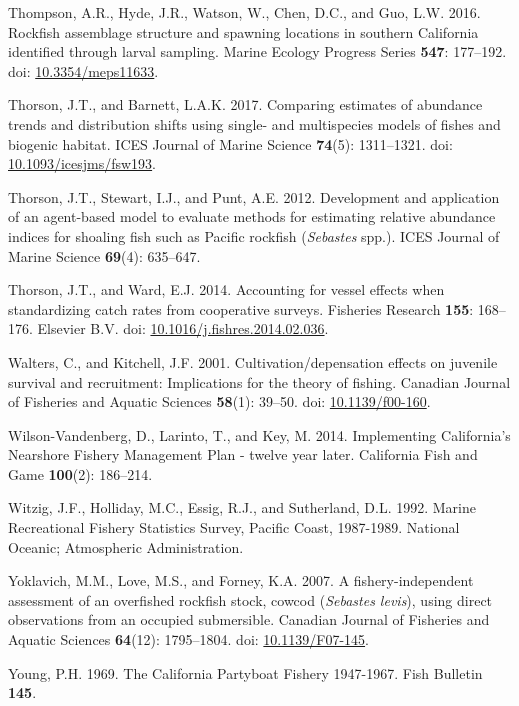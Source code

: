 \documentclass[
  english,
  a4paper,
]{article}
\newlength{\cslhangindent}
\newlength{\cslentryspacingunit} %
\newenvironment{CSLReferences}[2] %
 {%
  \setlength{\parindent}{0pt}
  \ifodd #1
  \let\oldpar\par
  \def\par{\hangindent=\cslhangindent\oldpar}
  \fi
  \setlength{\parskip}{#2\cslentryspacingunit}
 }%
 {}
\begin{document}
\begin{CSLReferences}{1}{0}
\leavevmode{}%
Thompson, A.R., Hyde, J.R., Watson, W., Chen, D.C., and Guo, L.W. 2016. {Rockfish assemblage structure and spawning locations in southern California identified through larval sampling}. Marine Ecology Progress Series \textbf{547}: 177--192. doi: \href{https://doi.org/10.3354/meps11633}{10.3354/meps11633}.

\leavevmode{}%
Thorson, J.T., and Barnett, L.A.K. 2017. {Comparing estimates of abundance trends and distribution shifts using single- and multispecies models of fishes and biogenic habitat}. ICES Journal of Marine Science \textbf{74}(5): 1311--1321. doi: \href{https://doi.org/10.1093/icesjms/fsw193}{10.1093/icesjms/fsw193}.

\leavevmode{}%
Thorson, J.T., Stewart, I.J., and Punt, A.E. 2012. {Development and application of an agent-based model to evaluate methods for estimating relative abundance indices for shoaling fish such as Pacific rockfish (\emph{Sebastes} spp.)}. ICES Journal of Marine Science \textbf{69}(4): 635--647.

\leavevmode{}%
Thorson, J.T., and Ward, E.J. 2014. {Accounting for vessel effects when standardizing catch rates from cooperative surveys}. Fisheries Research \textbf{155}: 168--176. Elsevier B.V. doi: \href{https://doi.org/10.1016/j.fishres.2014.02.036}{10.1016/j.fishres.2014.02.036}.

\leavevmode{}%
Walters, C., and Kitchell, J.F. 2001. {Cultivation/depensation effects on juvenile survival and recruitment: Implications for the theory of fishing}. Canadian Journal of Fisheries and Aquatic Sciences \textbf{58}(1): 39--50. doi: \href{https://doi.org/10.1139/f00-160}{10.1139/f00-160}.

\leavevmode{}%
Wilson-Vandenberg, D., Larinto, T., and Key, M. 2014. {Implementing California's Nearshore Fishery Management Plan - twelve year later}. California Fish and Game \textbf{100}(2): 186--214.

\leavevmode{}%
Witzig, J.F., Holliday, M.C., Essig, R.J., and Sutherland, D.L. 1992. {Marine Recreational Fishery Statistics Survey, Pacific Coast, 1987-1989}. National Oceanic; Atmospheric Administration.

\leavevmode{}%
Yoklavich, M.M., Love, M.S., and Forney, K.A. 2007. {A fishery-independent assessment of an overfished rockfish stock, cowcod (\emph{Sebastes levis}), using direct observations from an occupied submersible}. Canadian Journal of Fisheries and Aquatic Sciences \textbf{64}(12): 1795--1804. doi: \href{https://doi.org/10.1139/F07-145}{10.1139/F07-145}.

\leavevmode{}%
Young, P.H. 1969. {The California Partyboat Fishery 1947-1967}. Fish Bulletin \textbf{145}.

\end{CSLReferences}
\end{document}
